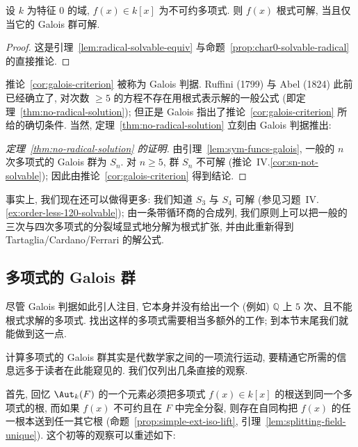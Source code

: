 \begin{corollary}\label{cor:galois-criterion}
设 $k$ 为特征 $0$ 的域, $f(x)\in k[x]$ 为不可约多项式. 则 $f(x)$ 根式可解, 当且仅当它的 Galois 群可解.
\end{corollary}

\begin{proof}
这是引理~\ref{lem:radical-solvable-equiv} 与命题~\ref{prop:char0-solvable-radical} 的直接推论.
\end{proof}

推论~\ref{cor:galois-criterion} 被称为 Galois 判据. Ruffini (1799) 与 Abel (1824) 此前已经确立了, 对次数 $\ge 5$ 的方程不存在用根式表示解的一般公式 (即定理~\ref{thm:no-radical-solution}); 但正是 Galois 指出了推论~\ref{cor:galois-criterion} 所给的确切条件. 当然, 定理~\ref{thm:no-radical-solution} 立刻由 Galois 判据推出:

\begin{proof}[定理~\ref{thm:no-radical-solution} 的证明]
由引理~\ref{lem:sym-funcs-galois}, 一般的 $n$ 次多项式的 Galois 群为 $S_n$. 对 $n\ge 5$, 群 $S_n$ 不可解 (推论~IV.\ref{cor:sn-not-solvable}); 因此由推论~\ref{cor:galois-criterion} 得到结论.
\end{proof}

事实上, 我们现在还可以做得更多: 我们知道 $S_3$ 与 $S_4$ 可解 (参见习题~IV.\ref{ex:order-less-120-solvable}); 由一条带循环商的合成列, 我们原则上可以把一般的三次与四次多项式的分裂域显式地分解为根式扩张, 并由此重新得到 Tartaglia/Cardano/Ferrari 的解公式.

\subsection{多项式的 Galois 群}
\label{subsec:poly-galois-groups}

尽管 Galois 判据如此引人注目, 它本身并没有给出一个 (例如) $\mathbb{Q}$ 上 $5$ 次、且不能根式求解的多项式. 找出这样的多项式需要相当多额外的工作; 到本节末尾我们就能做到这一点.

计算多项式的 Galois 群其实是代数学家之间的一项流行运动, 要精通它所需的信息远多于读者在此能窥见的. 我们仅列出几条直接的观察.

首先, 回忆 $\Aut_k(F)$ 的一个元素必须把多项式 $f(x)\in k[x]$ 的根送到同一个多项式的根, 而如果 $f(x)$ 不可约且在 $F$ 中完全分裂, 则存在自同构把 $f(x)$ 的任一根本送到任一其它根 (命题~\ref{prop:simple-ext-iso-lift}, 引理~\ref{lem:splitting-field-unique}). 这个初等的观察可以重述如下:

